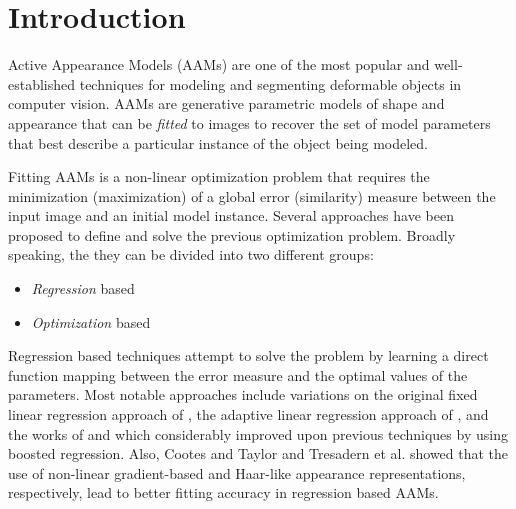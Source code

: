 \section{Introduction}
\label{sec:intro}

Active Appearance Models (AAMs) \cite{Cootes2001, Matthews2004} are one of the most popular and well-established techniques for modeling and segmenting deformable objects in computer vision. AAMs are generative parametric models of shape and appearance that can be \emph{fitted} to images to recover the set of model parameters that best describe a particular instance of the object being modeled.

Fitting AAMs is a non-linear optimization problem that requires the  minimization (maximization) of a global error (similarity) measure between the input image and an initial model instance. Several approaches \cite{Cootes2001, Hou2001, Matthews2004, Batur2005, Gross2005, Donner2006, Papandreou2008, Liu2009, Saragih2009, Amberg2009, Tresadern2010, Martins2010, Sauer2011, Tzimiropoulos2013, Kossaifi2014, Antonakos2014} have been proposed to define and solve the previous optimization problem. Broadly speaking, the they can be divided into two different groups: 
\begin{itemize}
\item \emph{Regression} based \cite{Cootes2001, Hou2001, Batur2005, Donner2006, Saragih2009, Tresadern2010, Sauer2011}
\item \emph{Optimization} based \cite{Matthews2004, Gross2005, Papandreou2008, Amberg2009, Martins2010, Tzimiropoulos2013, Kossaifi2014}
\end{itemize}

Regression based techniques attempt to solve the problem by learning a direct function mapping between the error measure and the optimal values of the parameters. Most notable approaches include variations on the original fixed linear regression approach of \cite{Cootes2001, Hou2001, Donner2006}, the adaptive linear regression approach of \cite{Batur2005}, and the works of \cite{Saragih2009} and \cite{Tresadern2010} which considerably improved upon previous techniques by using boosted regression. Also, Cootes and Taylor \cite{Cootes2001b} and Tresadern et al. \cite{Tresadern2010} showed that the use of non-linear gradient-based and Haar-like appearance representations, respectively, lead to better fitting accuracy in regression based AAMs. 

